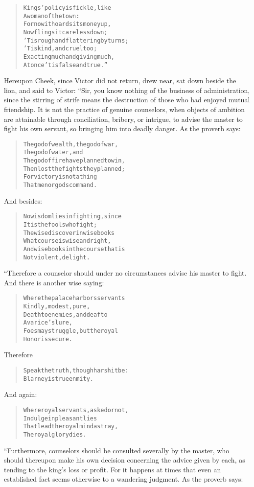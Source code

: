 \documentclass[article, twoside, 14pt]{memoir}
\renewenvironment{verbatim}{%
\begin{quote}%
\vskip -10pt%
\begin{alltt}\normalfont\large}{\end{alltt}%
\end{quote}%
\vskip -10pt
} %
\begin{document}
\begin{verbatim}
Kings' policy is fickle, like
    A woman of the town:
For now it hoards its money up,
    Now flings it careless down;
'Tis rough and flattering by turns;
    'Tis kind, and cruel too;
Exacting much and giving much,
    At once 'tis false and true.”
\end{verbatim}
Hereupon Cheek, since Victor did not return, drew near, sat down
beside the lion, and said to Victor: “Sir, you know nothing of the
business of administration, since the stirring of strife means the
destruction of those who had enjoyed mutual friendship. It is not
the practice of genuine counselors, when objects of ambition are
attainable through conciliation, bribery, or intrigue, to advise
the master to fight his own servant, so bringing him into deadly
danger. As the proverb says:

\begin{verbatim}
The god of wealth, the god of war,
    The god of water, and
The god of fire have planned to win,
    Then lost the fights they planned;
For victory is not a thing
    That men or gods command.
\end{verbatim}
And besides:

\begin{verbatim}
No wisdom lies in fighting, since
    It is the fools who fight;
The wise discover in wise books
    What course is wise and right,
And wise books in the course that is
    Not violent, delight.
\end{verbatim}
“Therefore a counselor should under no circumstances advise his
master to fight. And there is another wise saying:

\begin{verbatim}
Where the palace harbors servants
    Kindly, modest, pure,
Death to enemies, and deaf to
    Avarice's lure,
Foes may struggle, but the royal
    Honor is secure.
\end{verbatim}
Therefore

\begin{verbatim}
Speak the truth, though harsh it be:
Blarney is true enmity.
\end{verbatim}
And again:

\begin{verbatim}
Where royal servants, asked or not,
    Indulge in pleasant lies
That lead the royal mind astray,
    The royal glory dies.
\end{verbatim}
“Furthermore, counselors should be consulted severally by the
master, who should thereupon make his own decision concerning the
advice given by each, as tending to the king's loss or profit. For
it happens at times that even an established fact seems otherwise
to a wandering judgment. As the proverb says:
\end{document}

